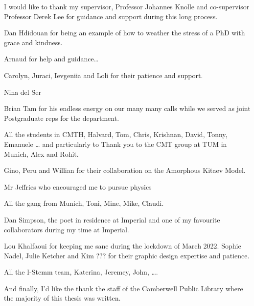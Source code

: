 I would like to thank my supervisor, Professor Johannes Knolle and co-supervisor Professor Derek Lee for guidance and support during this long process.

Dan Hdidouan for being an example of how to weather the stress of a PhD with grace and kindness.

Arnaud for help and guidance\ldots{}

Carolyn, Juraci, Ievgeniia and Loli for their patience and support.

Nina del Ser

Brian Tam for his endless energy on our many many calls while we served as joint Postgraduate reps for the department.

All the students in CMTH, Halvard, Tom, Chris, Krishnan, David, Tonny, Emanuele \ldots{} and particularly to Thank you to the CMT group at TUM in Munich, Alex and Rohit.

Gino, Peru and Willian for their collaboration on the Amorphous Kitaev Model.

Mr Jeffries who encouraged me to pursue physics

All the gang from Munich, Toni, Mine, Mike, Claudi.

Dan Simpson, the poet in residence at Imperial and one of my favourite collaborators during my time at Imperial.

Lou Khalfaoui for keeping me sane during the lockdown of March 2022. Sophie Nadel, Julie Ketcher and Kim ??? for their graphic design expertise and patience.

All the I-Stemm team, Katerina, Jeremey, John, \ldots.

And finally, I'd like the thank the staff of the Camberwell Public Library where the majority of this thesis was written.
